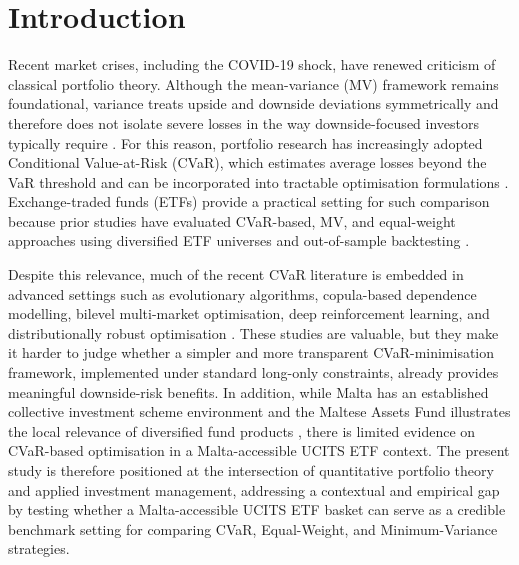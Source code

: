 \section{Introduction}
\label{sec:Int}
\par Recent market crises, including the COVID-19 shock, have renewed criticism of classical portfolio theory. Although the mean-variance (MV) framework remains foundational, variance treats upside and downside deviations symmetrically and therefore does not isolate severe losses in the way downside-focused investors typically require \cite{munoz2026riskmetrics,kaucic2019riskmeasures}. For this reason, portfolio research has increasingly adopted Conditional Value-at-Risk (CVaR), which estimates average losses beyond the VaR threshold and can be incorporated into tractable optimisation formulations \cite{kaucic2019riskmeasures,teplova2023blcopula}. Exchange-traded funds (ETFs) provide a practical setting for such comparison because prior studies have evaluated CVaR-based, MV, and equal-weight approaches using diversified ETF universes and out-of-sample backtesting \cite{teplova2023blcopula}.
\par Despite this relevance, much of the recent CVaR literature is embedded in advanced settings such as evolutionary algorithms, copula-based dependence modelling, bilevel multi-market optimisation, deep reinforcement learning, and distributionally robust optimisation \cite{kaucic2019riskmeasures,teplova2023blcopula,nasini2022multimarket,cui2023cvarrlcrypto,kobayashi2023cardinalitydro}. These studies are valuable, but they make it harder to judge whether a simpler and more transparent CVaR-minimisation framework, implemented under standard long-only constraints, already provides meaningful downside-risk benefits. In addition, while Malta has an established collective investment scheme environment and the Maltese Assets Fund illustrates the local relevance of diversified fund products \cite{hsbc2026malteseassetsfund,mfsa2025nav}, there is limited evidence on CVaR-based optimisation in a Malta-accessible UCITS ETF context. The present study is therefore positioned at the intersection of quantitative portfolio theory and applied investment management, addressing a contextual and empirical gap by testing whether a Malta-accessible UCITS ETF basket can serve as a credible benchmark setting for comparing CVaR, Equal-Weight, and Minimum-Variance strategies.
